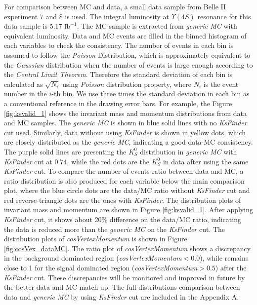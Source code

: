 For comparison between MC and data, a small data sample from Belle II experiment 7 and 8 is used. The integral luminosity at $\Upsilon(4S)$ resonance for this data sample is 5.17 $\text{fb}^{-1}$. The MC sample is extracted from \textit{generic MC} with equivalent luminosity. Data and MC events are filled in the binned histogram of each variables to check the consistency. 
The number of events in each bin is assumed to follow the \textit{Poisson} Distribution, which is approximately equivalent to the \textit{Gaussian} distribution when the number of events is large enough according to the \textit{Central Limit Theorem}. Therefore the standard deviation of each bin is calculated as $\sqrt{N_i}$ using \textit{Poisson} distribution property, where $N_i$ is the event number in the $i$-th bin. We use three times the standard deviation in each bin as a conventional reference in the drawing error bars.  For example, the Figure \ref{fig:ksvalid_1} shows the invariant mass and momentum distributions from data and MC samples. The \textit{generic MC} is shown in blue solid lines with no \textit{KsFinder} cut used. Similarly, data without using \textit{KsFinder} is shown in yellow dots, which are closely distributed as the \textit{generic MC}, indicating a good data-MC consistency. The purple solid lines are presenting the $K_S^0$ distribution in \textit{generic MC} with \textit{KsFinder} cut at 0.74, while the red dots are the $K_S^0$ in data after using the same \textit{KsFinder} cut. To compare the number of events ratio between data and MC, a ratio distribution is also produced for each variable below the main comparison plot, where the blue circle dots are the data/MC ratio without \textit{KsFinder} cut and red reverse-triangle dots are the ones with \textit{KsFinder}. The distribution plots of invariant mass and momentum are shown in Figure \ref{fig:ksvalid_1}.
 After applying \textit{KsFinder} cut, it shows about 20\% difference on the data/MC ratio, indicating the data is reduced more than the \textit{generic MC} on the \textit{KsFinder} cut. The distribution plots of \textit{cosVertexMomentum} is shown in Figure \ref{fig:cosVex_dataMC}. The ratio plot of \textit{cosVertexMomentum}  shows a discrepancy in the background dominated region (\textit{cosVertexMomentum}$<0.0$), while remains close to 1 for the signal dominated region (\textit{cosVertexMomentum}$>0.5$) after the \textit{KsFinder} cut. 
These discrepancies will be monitored and improved in future by the better data and MC match-up.  The full distributions comparison between data and \textit{generic MC} by using  \textit{KsFinder} cut are included in the Appendix A.  

